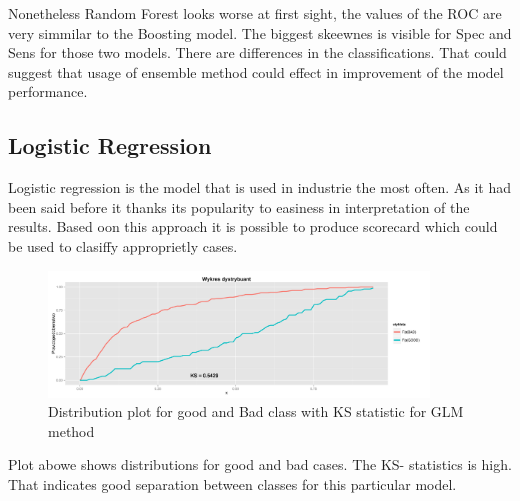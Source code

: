 \documentclass[10pt]{article}\usepackage[]{graphicx}\usepackage[]{color}
\begin{document}
Nonetheless Random Forest looks worse at first sight, the values of the ROC are very simmilar to the Boosting model. The biggest skeewnes is visible for Spec and Sens for those two models. There are differences in the classifications. That could suggest that usage of ensemble method could effect in improvement of the model performance. 


\clearpage

\subsection{Logistic Regression}

Logistic regression is the model that is used in industrie the most often. As it had been said before it thanks its popularity to easiness in interpretation of the results. Based oon this approach it is possible to produce scorecard which could be used to clasiffy approprietly cases. 

\begin{figure}[h!]
  \centering
  \includegraphics[width=0.9\textwidth]{Plots/GLM_KS}
  \caption[Close up of \textit{Hemidactylus} sp.]
   {Distribution plot for good and Bad class with KS statistic for GLM method}
\end{figure}

Plot abowe shows distributions for good and bad cases. The KS- statistics is high. That indicates good separation between classes for this particular model. 
\end{document}
